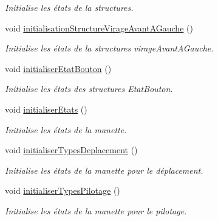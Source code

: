 \begin{DoxyCompactItemize}
\begin{DoxyCompactList}\small\item\em Initialise les états de la structures. \end{DoxyCompactList}\item 
void \hyperlink{class_manette_aa02a2dfa49318e1043b52dd103fa1795}{initialisation\+Structure\+Virage\+Avant\+A\+Gauche} ()
\begin{DoxyCompactList}\small\item\em Initialise les états de la structures virage\+Avant\+A\+Gauche. \end{DoxyCompactList}\item 
void \hyperlink{class_manette_a21ebb19837250342e4859ba7dc5f03cc}{initialiser\+Etat\+Bouton} ()
\begin{DoxyCompactList}\small\item\em Initialise les états des structures Etat\+Bouton. \end{DoxyCompactList}\item 
void \hyperlink{class_manette_afd722561b4cc62304e81a8e41c820bb8}{initialiser\+Etats} ()
\begin{DoxyCompactList}\small\item\em Initialise les états de la manette. \end{DoxyCompactList}\item 
void \hyperlink{class_manette_a9888b04a784ceda912a35b6eb30ae84a}{initialiser\+Types\+Deplacement} ()
\begin{DoxyCompactList}\small\item\em Initialise les états de la manette pour le déplacement. \end{DoxyCompactList}\item 
void \hyperlink{class_manette_ab20afdb190b24126e54d4f80af0bf310}{initialiser\+Types\+Pilotage} ()
\begin{DoxyCompactList}\small\item\em Initialise les états de la manette pour le pilotage. \end{DoxyCompactList}\end{DoxyCompactItemize}

